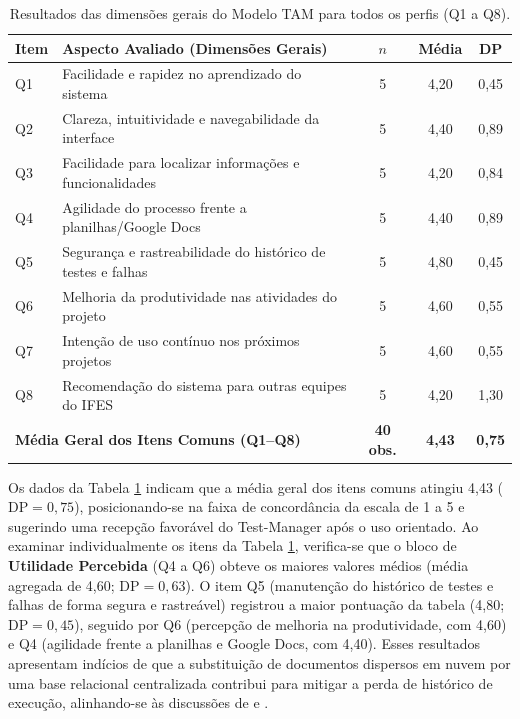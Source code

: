 \begin{table}[H]
\centering
\caption{Resultados das dimensões gerais do Modelo TAM para todos os perfis (Q1 a Q8).}
\label{tab:resultados_tam_geral}
\small
\begin{tabularx}{\textwidth}{|l|X|c|c|c|}
\hline
\textbf{Item} & \textbf{Aspecto Avaliado (Dimensões Gerais)} & \textbf{$n$} & \textbf{Média} & \textbf{DP} \\ \hline
Q1 & Facilidade e rapidez no aprendizado do sistema & 5 & 4,20 & 0,45 \\ \hline
Q2 & Clareza, intuitividade e navegabilidade da interface & 5 & 4,40 & 0,89 \\ \hline
Q3 & Facilidade para localizar informações e funcionalidades & 5 & 4,20 & 0,84 \\ \hline
Q4 & Agilidade do processo frente a planilhas/Google Docs & 5 & 4,40 & 0,89 \\ \hline
Q5 & Segurança e rastreabilidade do histórico de testes e falhas & 5 & 4,80 & 0,45 \\ \hline
Q6 & Melhoria da produtividade nas atividades do projeto & 5 & 4,60 & 0,55 \\ \hline
Q7 & Intenção de uso contínuo nos próximos projetos & 5 & 4,60 & 0,55 \\ \hline
Q8 & Recomendação do sistema para outras equipes do IFES & 5 & 4,20 & 1,30 \\ \hline
\multicolumn{2}{|l|}{\textbf{Média Geral dos Itens Comuns (Q1--Q8)}} & \textbf{40 obs.} & \textbf{4,43} & \textbf{0,75} \\ \hline
\end{tabularx}
\end{table}

Os dados da Tabela \ref{tab:resultados_tam_geral} indicam que a média geral dos itens comuns atingiu 4,43 ($\text{DP} = 0,75$), posicionando-se na faixa de concordância da escala de 1 a 5 e sugerindo uma recepção favorável do Test-Manager após o uso orientado. Ao examinar individualmente os itens da Tabela \ref{tab:resultados_tam_geral}, verifica-se que o bloco de \textbf{Utilidade Percebida} (Q4 a Q6) obteve os maiores valores médios (média agregada de 4,60; $\text{DP} = 0,63$). O item Q5 (manutenção do histórico de testes e falhas de forma segura e rastreável) registrou a maior pontuação da tabela (4,80; $\text{DP} = 0,45$), seguido por Q6 (percepção de melhoria na produtividade, com 4,60) e Q4 (agilidade frente a planilhas e Google Docs, com 4,40). Esses resultados apresentam indícios de que a substituição de documentos dispersos em nuvem por uma base relacional centralizada contribui para mitigar a perda de histórico de execução, alinhando-se às discussões de  e .

